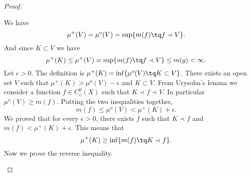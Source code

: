\begin{proof}
\begin{subproof}
        We have
        \begin{equation}
            \mu^+(V)=\mu^o(V)=\sup\{ m(f)\tq f\prec V \}.
        \end{equation}
        And since \( K\subset V\) we have
        \begin{equation}
            \mu^+(K)\leq \mu^+(V)=\sup\{ m(f)\tq f\prec V \}\leq m(g)<\infty.
        \end{equation}
    \spitem[\( \mu^+(K)=\inf\{ m(f):\, K\prec f \}\)]
        Let \( \epsilon>0\). The definition is \( \mu^+(K)=\inf\{ \mu^o(V)\tq K\subset V \}\). There exists an open set \( V\) such that \( \mu^+(K)>\mu^o(V)-\epsilon\) and \( K\subset V\). From Urysohn's lemma we consider a function \( f\in C^0_c(X)\) such that \( K\prec f\prec V\). In particular \( \mu^o(V)\geq m(f)\). Putting the two inequalities together,
        \begin{equation}
            m(f)\leq \mu^o(V)<\mu^+(K)+\epsilon.
        \end{equation}
        We proved that for every \( \epsilon>0\), there exists \( f\) such that \( K\prec f\) and \( m(f)<\mu^+(K)+\epsilon\). This means that
        \begin{equation}
            \mu^+(K)\geq\inf\{ m(f)\tq K\prec f \}.
        \end{equation}
        Now we prove the reverse inequality.


\end{subproof}
\end{proof}
